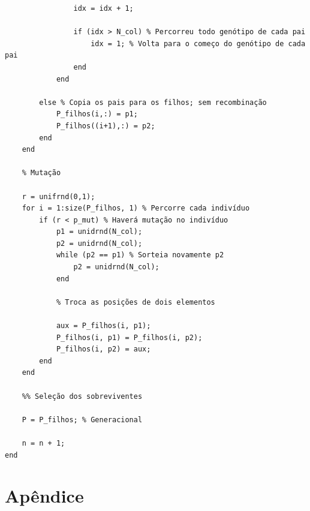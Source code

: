 \documentclass{report}
\begin{document}
\begin{lstlisting}
                idx = idx + 1;
                
                if (idx > N_col) % Percorreu todo genótipo de cada pai
                    idx = 1; % Volta para o começo do genótipo de cada pai
                end
            end
            
        else % Copia os pais para os filhos; sem recombinação
            P_filhos(i,:) = p1;
            P_filhos((i+1),:) = p2;
        end
    end
    
    % Mutação
    
    r = unifrnd(0,1);
    for i = 1:size(P_filhos, 1) % Percorre cada indivíduo
        if (r < p_mut) % Haverá mutação no indivíduo
            p1 = unidrnd(N_col);
            p2 = unidrnd(N_col);
            while (p2 == p1) % Sorteia novamente p2
                p2 = unidrnd(N_col);
            end
    
            % Troca as posições de dois elementos

            aux = P_filhos(i, p1); 
            P_filhos(i, p1) = P_filhos(i, p2);
            P_filhos(i, p2) = aux;
        end
    end

    %% Seleção dos sobreviventes

    P = P_filhos; % Generacional
             
    n = n + 1;
end

	\end{lstlisting}

	\section*{Apêndice}
	
\end{document}
